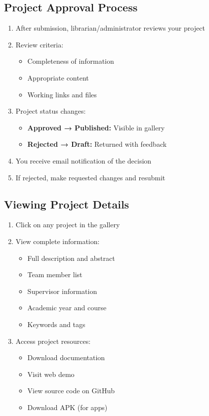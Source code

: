 \documentclass[12pt,a4paper]{article}
\begin{document}
\subsection{Project Approval Process}
\begin{enumerate}[leftmargin=*]
    \item After submission, librarian/administrator reviews your project
    \item Review criteria:
        \begin{itemize}
            \item Completeness of information
            \item Appropriate content
            \item Working links and files
        \end{itemize}
    \item Project status changes:
        \begin{itemize}
            \item \textbf{Approved → Published:} Visible in gallery
            \item \textbf{Rejected → Draft:} Returned with feedback
        \end{itemize}
    \item You receive email notification of the decision
    \item If rejected, make requested changes and resubmit
\end{enumerate}

\subsection{Viewing Project Details}
\begin{enumerate}[leftmargin=*]
    \item Click on any project in the gallery
    \item View complete information:
        \begin{itemize}
            \item Full description and abstract
            \item Team member list
            \item Supervisor information
            \item Academic year and course
            \item Keywords and tags
        \end{itemize}
    \item Access project resources:
        \begin{itemize}
            \item Download documentation
            \item Visit web demo
            \item View source code on GitHub
            \item Download APK (for apps)
        \end{itemize}
\end{enumerate}
\end{document}
